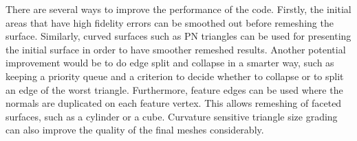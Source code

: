 \documentclass[letter,11pt]{article}
\begin{document}
There are several ways to improve the performance of the
code. Firstly, the initial areas that have high fidelity errors can be
smoothed out before remeshing the surface. Similarly, curved surfaces
such as PN triangles can be used for presenting the initial surface in
order to have smoother remeshed results. Another potential improvement
would be to do edge split and collapse in a smarter way, such as
keeping a priority queue and a criterion to decide whether to collapse
or to split an edge of the worst triangle. Furthermore, feature edges
can be used where the normals are duplicated on each feature
vertex. This allows remeshing of faceted surfaces, such as a cylinder
or a cube. Curvature sensitive triangle size grading can also improve
the quality of the final meshes considerably.



\end{document}
